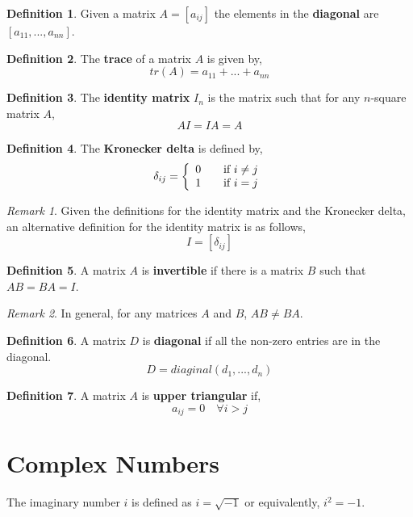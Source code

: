 \documentclass{report}
\theoremstyle{definition}
\newtheorem*{_def}{Definition}
\theoremstyle{remark}
\newtheorem{_rem}{Remark}[section]
\begin{document}
\begin{_def}
Given a matrix $A=[a_{ij}]$ the elements in the \textbf{diagonal} are $[a_{11},...,a_{nn}]$.
\end{_def}

\begin{_def}
The \textbf{trace} of a matrix $A$ is given by,
\[tr(A)=a_{11}+...+a_{nn}\]
\end{_def}

\begin{_def}
The \textbf{identity matrix} $I_n$ is the matrix such that for any $n$-square matrix $A$,
\[AI=IA=A\]
\end{_def}

\begin{_def}
The \textbf{Kronecker delta} is defined by,
\[\delta_{ij}=\left\{ 
  \begin{array}{l l}
    0 & \quad \text{if } i\neq j\\
    1 & \quad \text{if } i=j
  \end{array} \right.\]
\end{_def}

\begin{_rem}
Given the definitions for the identity matrix and the Kronecker delta, an alternative definition for the identity matrix is as follows,
\[I=[\delta_{ij}]\]
\end{_rem}

\begin{_def}
A matrix $A$ is \textbf{invertible} if there is a matrix $B$ such that $AB=BA=I$.
\end{_def}

\begin{_rem}
In general, for any matrices $A$ and $B$, $AB\neq BA$.
\end{_rem}

\begin{_def}
A matrix $D$ is \textbf{diagonal} if all the non-zero entries are in the diagonal.
\[D=diaginal(d_1,...,d_n)\]
\end{_def}

\begin{_def}
A matrix $A$ is \textbf{upper triangular} if,
\[a_{ij}=0 \quad \forall i>j\]
\end{_def}

\section{Complex Numbers}

The imaginary number $i$ is defined as $i=\sqrt{-1}$ or equivalently, $i^2=-1$.
\end{document}
